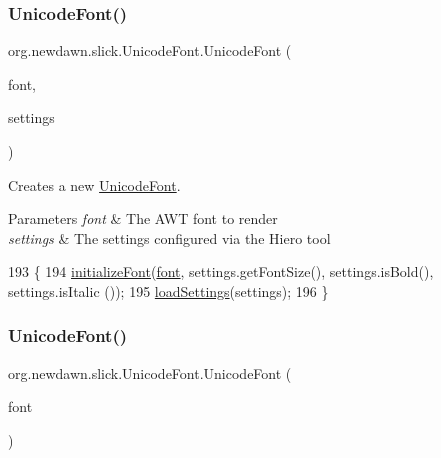 \subsubsection{\texorpdfstring{Unicode\+Font()}{UnicodeFont()}\hspace{0.1cm}{\footnotesize\ttfamily [5/7]}}
{\footnotesize\ttfamily org.\+newdawn.\+slick.\+Unicode\+Font.\+Unicode\+Font (\begin{DoxyParamCaption}\item[{\mbox{\hyperlink{interfaceorg_1_1newdawn_1_1slick_1_1_font}{Font}}}]{font,  }\item[{\mbox{\hyperlink{classorg_1_1newdawn_1_1slick_1_1font_1_1_hiero_settings}{Hiero\+Settings}}}]{settings }\end{DoxyParamCaption})\hspace{0.3cm}{\ttfamily [inline]}}

Creates a new \mbox{\hyperlink{classorg_1_1newdawn_1_1slick_1_1_unicode_font}{Unicode\+Font}}.


\begin{DoxyParams}{Parameters}
{\em font} & The A\+WT font to render \\
\hline
{\em settings} & The settings configured via the Hiero tool \\
\hline
\end{DoxyParams}

\begin{DoxyCode}
193                                                            \{
194         \mbox{\hyperlink{classorg_1_1newdawn_1_1slick_1_1_unicode_font_a50d0619aea65cc8ebdc66a2d7c63aede}{initializeFont}}(\mbox{\hyperlink{classorg_1_1newdawn_1_1slick_1_1_unicode_font_a956ab491839be375d47444a67ebff11c}{font}}, settings.getFontSize(), settings.isBold(), settings.isItalic
      ());
195         \mbox{\hyperlink{classorg_1_1newdawn_1_1slick_1_1_unicode_font_aa3d36e87e8bb263a354409ed1c1f761b}{loadSettings}}(settings);
196     \}
\end{DoxyCode}
\mbox{\label{classorg_1_1newdawn_1_1slick_1_1_unicode_font_a7fffd4b694c8c4c749feba89f8d9eba7}} 
\subsubsection{\texorpdfstring{Unicode\+Font()}{UnicodeFont()}\hspace{0.1cm}{\footnotesize\ttfamily [6/7]}}
{\footnotesize\ttfamily org.\+newdawn.\+slick.\+Unicode\+Font.\+Unicode\+Font (\begin{DoxyParamCaption}\item[{\mbox{\hyperlink{interfaceorg_1_1newdawn_1_1slick_1_1_font}{Font}}}]{font }\end{DoxyParamCaption})\hspace{0.3cm}{\ttfamily [inline]}}

